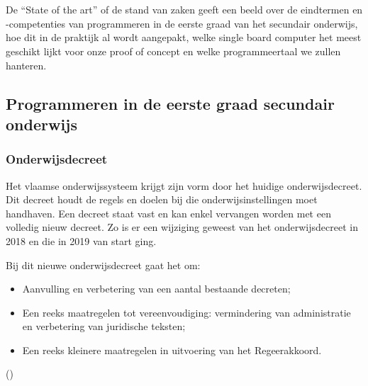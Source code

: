 
\chapter{}
\label{ch:stand-van-zaken}




De “State of the art” of de stand van zaken geeft een beeld over de eindtermen en -competenties van programmeren in de eerste graad van het secundair onderwijs, hoe dit in de praktijk al wordt aangepakt, welke single board computer het meest geschikt lijkt voor onze proof of concept en welke programmeertaal we zullen hanteren.

\section{Programmeren in de eerste graad secundair onderwijs}	

\subsection{Onderwijsdecreet}
\label{onderwijsdecreet}



Het vlaamse onderwijssysteem krijgt zijn vorm door het huidige onderwijsdecreet. Dit decreet houdt de regels en doelen bij die onderwijsinstellingen moet handhaven. Een decreet staat vast en kan enkel vervangen worden met een volledig nieuw decreet. 
Zo is er een wijziging geweest van het onderwijsdecreet in 2018 en die in 2019 van start ging.  


Bij dit nieuwe onderwijsdecreet gaat het om:

\begin{itemize}
    \item Aanvulling en verbetering van een aantal bestaande decreten;
    \item Een reeks maatregelen tot vereenvoudiging: vermindering van administratie en verbetering van juridische teksten;
    \item Een reeks kleinere maatregelen in uitvoering van het Regeerakkoord.
\end{itemize} (\cite{VLOR2020})

